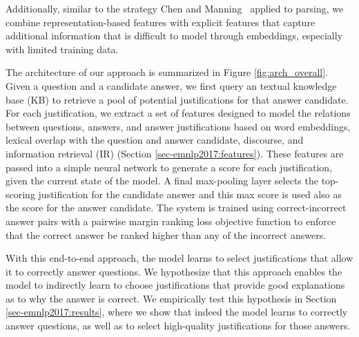 Additionally, similar to the strategy Chen and Manning~\citeyear{chen2014fast} applied to parsing, we combine representation-based features with explicit features that capture additional information that is difficult to model through embeddings, especially with limited training data.



The architecture of our approach is summarized in Figure \ref{fig:arch_overall}.  
Given a question and a candidate answer, we first query an textual knowledge base (KB) to retrieve a pool of potential justifications for that answer candidate.  
For each justification, we extract a set of features designed to model the relations between questions, answers, and answer justifications based on word embeddings, lexical overlap with the question and answer candidate, discourse, and information retrieval (IR) (Section \ref{sec-emnlp2017:features}).
These features are passed into a simple neural network to generate a score for each justification, given the current state of the model.  A final max-pooling layer selects the top-scoring justification for the candidate answer and this max score is used also as the score for the answer candidate.  
The system is trained using correct-incorrect answer pairs with a pairwise margin ranking loss objective function to enforce that the correct answer be ranked higher than any of the incorrect answers. 


With this end-to-end approach, the model learns to select justifications that allow it to correctly answer questions.  We hypothesize that this approach enables the model to indirectly learn to choose justifications that provide good explanations as to why the answer is correct. We empirically test this hypothesis in Section \ref{sec-emnlp2017:results}, where we show that indeed the model learns to correctly answer questions, as well as to select high-quality justifications for those answers. 
